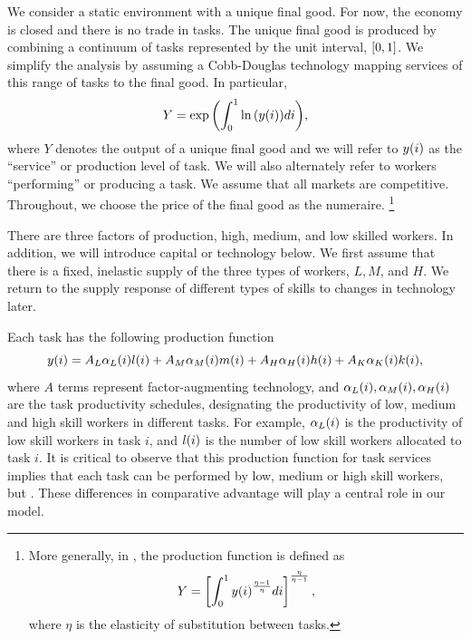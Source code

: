\documentclass[12pt]{article}
\newcommand{\highlightP}[1]{{\emph{\color{MyPink}{#1}}}}
\theoremstyle{definition}
\begin{document}
We consider a static environment with a unique final good. For now, the economy is closed and there is no trade in tasks. The unique final good is produced by combining a continuum of tasks represented by the unit interval, $\left[ 0,1 \right]$. We simplify the analysis by assuming a Cobb-Douglas technology mapping services of this range of tasks to the final good. In particular, 
\begin{equation} 
    \label{task_model_good_production}
	Y = \exp\of{\int_0^1 \ln\of{y\of{i}} di}, 
\end{equation}
where $Y$ denotes the output of a unique final good and we will refer to $y{\left( i \right)}$ as the ``service'' or production level of task. We will also alternately refer to workers ``performing'' or producing a task. We assume that all markets are competitive. Throughout, we choose the price of the final good as the numeraire.
\footnote{
    More generally, in \citet{autorTaskApproachLabor2013}, the production function is defined as 
    \begin{equation}
        \notag
        Y=\left[ \int_0^1 y{\left( i \right)}^{\frac{\eta-1}{\eta}} d i \right]^{\frac{\eta}{\eta-1}},
    \end{equation}
    where $\eta$ is the elasticity of substitution between tasks.
}

There are three factors of production, high, medium, and low skilled workers. In addition, we will introduce capital or technology below. We first assume that there is a fixed, inelastic supply of the three types of workers, $L, M$, and $H$. We return to the supply response of different types of skills to changes in technology later. 

Each task has the following production function
\begin{equation} 
    \label{task_model_task_production}
	y{\left( i \right)} = A_L \alpha_L{\left( i \right)} l{\left( i \right)} + A_M \alpha_M{\left( i \right)} m{\left( i \right)} + A_H \alpha_H{\left( i \right)} h{\left( i \right)} + A_K \alpha_K{\left( i \right)} k{\left( i \right)},
\end{equation}
where $A$ terms represent factor-augmenting technology, and $\alpha_L{\left( i \right)}, \alpha_M{\left( i \right)}, \alpha_H{\left( i \right)}$ are the task productivity schedules, designating the productivity of {low, medium and high skill} workers in different tasks. For example, $\alpha_L{\left( i \right)}$ is the productivity of low skill workers in task $i$, and $l{\left( i \right)}$ is the number of low skill workers allocated to task $i$. It is critical to observe that this production function for task services implies that each task can be performed by low, medium or high skill workers, but \highlightP{the comparative advantage of skill groups differ across tasks, as captured by the $\a$ terms}. These differences in comparative advantage will play a central role in our model.
\end{document}
